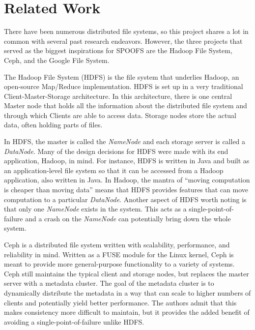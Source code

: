 \section{Related Work}
\label{sec:related_work}

There have been numerous distributed file systems, so this project shares a lot in common with several past research endeavors.  However, the three projects that served as the biggest inspirations for SPOOFS are the Hadoop File System, Ceph, and the Google File System.

The Hadoop File System (HDFS) \cite{borthakur_hdfs09} is the file system that underlies Hadoop, an open-source Map/Reduce implementation.  HDFS is set up in a very traditional Client-Master-Storage architecture.  In this architecture, there is one central Master node that holds all the information about the distributed file system and through which Clients are able to access data.  Storage nodes store the actual data, often holding parts of files.

In HDFS, the master is called the \textit{NameNode} and each storage server is called a \textit{DataNode}.  Many of the design decisions for HDFS were made with its end application, Hadoop, in mind.  For instance, HDFS is written in Java and built as an application-level file system so that it can be accessed from a Hadoop application, also written in Java.  In Hadoop, the mantra of ``moving computation is cheaper than moving data'' means that HDFS provides features that can move computation to a particular \textit{DataNode}.  Another aspect of HDFS worth noting is that only one \textit{NameNode} exists in the system.  This acts as a single-point-of-failure and a crash on the \textit{NameNode} can potentially bring down the whole system.

Ceph \cite{weil_osdi06} is a distributed file system written with scalability, performance, and reliability in mind.  Written as a FUSE module for the Linux kernel, Ceph is meant to provide more general-purpose functionality to a variety of systems.  Ceph still maintains the typical client and storage nodes, but replaces the master server with a metadata cluster.  The goal of the metadata cluster is to dynamically distribute the metadata in a way that can scale to higher numbers of clients and potentially yield better performance.  The authors admit that this makes consistency more difficult to maintain, but it provides the added benefit of avoiding a single-point-of-failure unlike HDFS.

